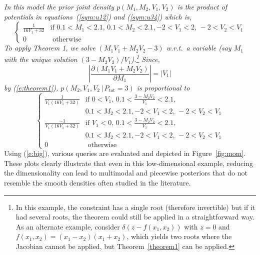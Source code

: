 \documentclass[letterpaper]{article}
\newcommand{\otherwise}[1]{#1 &\text{ otherwise}}
\newcommand{\pr}{p}
\begin{document}
\emph{
\noindent
In this model the prior joint density ${\pr(M_1, M_2, V_1, V_2)}$ is the product of potentials in equations~(\ref{sym:u12}) and (\ref{sym:u34}) which is,
$$
\begin{cases}
\frac{1}{16 V_1 + 32} &{\text{if }\scriptstyle 0.1<M_1<2.1, \, 0.1<M_2<2.1,}
							 {\scriptstyle -2<V_1<2, \, -2<V_2 < V_1}\\
 \otherwise{0}
 \end{cases}
$$  
To apply Theorem 1, we solve {\footnotesize$(M_1 V_1 + M_2 V_2 - 3)$}
w.r.t.\ a variable (say $M_1$ with the unique solution {\footnotesize$(3 - M_2 V_2)/V_1$}).\footnote{
In this example, the constraint has a single root (therefore invertible) but if it had several roots, the theorem could still be applied in a straightforward way.  As an alternate example, consider $\delta(z - f(x_1,x_2))$ with $z=0$ and $f(x_1,x_2) = (x_1-x_2)(x_1+x_2)$, which yields two roots where the Jacobian cannot be applied, but Theorem~\ref{theorem1} can be applied.}
Since,  
{\footnotesize
$$\left| \frac{\partial (M_1 V_1 + M_2 V_2)}{\partial M_1} \right| = |V_1|
$$
}
by (\ref{e:theorem1}),
$\pr(M_2, V_1, V_2 \,|\, P_\text{tot} = 3)$ is proportional to
{\footnotesize
\begin{equation}\label{e:big}  
\begin{cases}
\frac{1}{V_1(16 V_1 + 32)} &{\text{if }\scriptstyle 0<V_1, \, 0.1<\frac{3-M_2 V_2}{V_1}<2.1,}\\
							 &{\scriptstyle 0.1<M_2<2.1, -2<V_1<2, \, -2<V_2 < V_1}\\
\frac{-1}{V_1(16 V_1 + 32)} &{\text{if }\scriptstyle V_1<0, \, 0.1<\frac{3-M_2 V_2}{V_1}<2.1,}\\
							 &{\scriptstyle 0.1<M_2<2.1, -2<V_1<2, \, -2<V_2 < V_1}\\
 \otherwise{0}
 \end{cases}
\end{equation}
}
}%
Using (\ref{e:big}), various queries are evaluated and depicted in Figure~\ref{fig:mom}.
These plots clearly illustrate that even in this 
low-dimensional example, reducing the dimensionality can lead
to multimodal and piecewise posteriors that do not resemble the
smooth densities often studied in the literature.  
\end{document}
